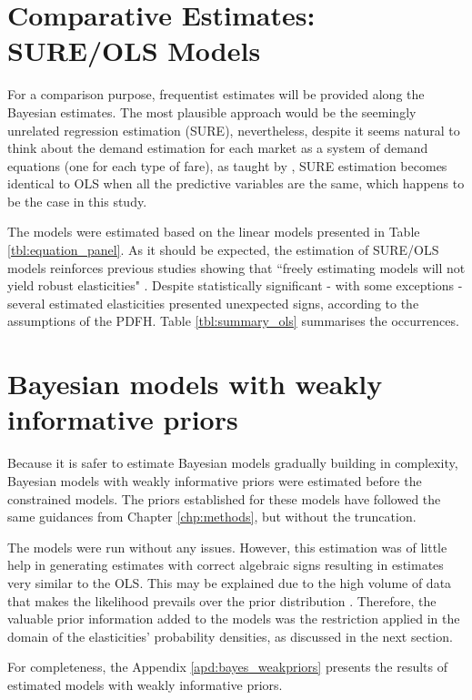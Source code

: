 \section{Comparative Estimates: SURE/OLS Models}

For a comparison purpose, frequentist estimates will be provided along the Bayesian estimates. The most plausible approach would be the seemingly unrelated regression estimation (SURE), nevertheless, despite it seems natural to think about the demand estimation for each market as a system of demand equations (one for each type of fare), as taught by \cite{kennedy2003}, SURE estimation becomes identical to OLS when all the predictive variables are the same, which happens to be the case in this study.

The models were estimated based on the linear models presented in Table \ref{tbl:equation_panel}. As it should be expected, the estimation of SURE/OLS models reinforces previous studies showing that ``freely estimating models will not yield robust elasticities" \citep[p.~37]{its-systra-report}. Despite statistically significant - with some exceptions - several estimated elasticities presented unexpected signs, according to the assumptions of the PDFH. Table \ref{tbl:summary_ols} summarises the occurrences. 



\section{Bayesian models with weakly informative priors}

Because it is safer to estimate Bayesian models gradually building in complexity, Bayesian models with weakly informative priors were estimated before the constrained models. The priors established for these models have followed the same guidances from Chapter \ref{chp:methods}, but without the truncation.

The models were run without any issues. However, this estimation was of little help in generating estimates with correct algebraic signs resulting in estimates very similar to the OLS. This may be explained due to the high volume of data that makes the likelihood prevails over the prior distribution \citep{kruschke2014}. Therefore, the valuable prior information added to the models was the restriction applied in the domain of the elasticities' probability densities, as discussed in the next section.

For completeness, the Appendix \ref{apd:bayes_weakpriors} presents the results of estimated models with weakly informative priors. 

